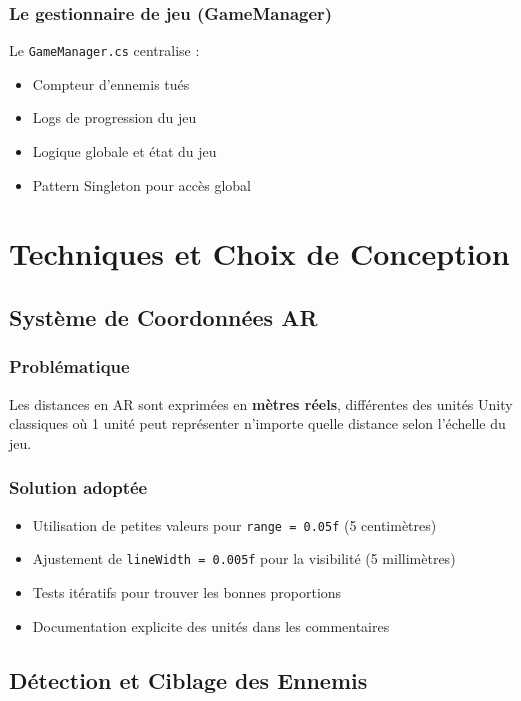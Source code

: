 \documentclass[12pt,a4paper]{article}
\begin{document}
\subsubsection{Le gestionnaire de jeu (GameManager)}

Le \texttt{GameManager.cs} centralise :
\begin{itemize}
    \item Compteur d'ennemis tués
    \item Logs de progression du jeu
    \item Logique globale et état du jeu
    \item Pattern Singleton pour accès global
\end{itemize}

\section{Techniques et Choix de Conception}

\subsection{Système de Coordonnées AR}

\subsubsection{Problématique}
Les distances en AR sont exprimées en \textbf{mètres réels}, différentes des unités Unity classiques où 1 unité peut représenter n'importe quelle distance selon l'échelle du jeu.

\subsubsection{Solution adoptée}
\begin{itemize}
    \item Utilisation de petites valeurs pour \texttt{range = 0.05f} (5 centimètres)
    \item Ajustement de \texttt{lineWidth = 0.005f} pour la visibilité (5 millimètres)
    \item Tests itératifs pour trouver les bonnes proportions
    \item Documentation explicite des unités dans les commentaires
\end{itemize}

\subsection{Détection et Ciblage des Ennemis}
\end{document}
